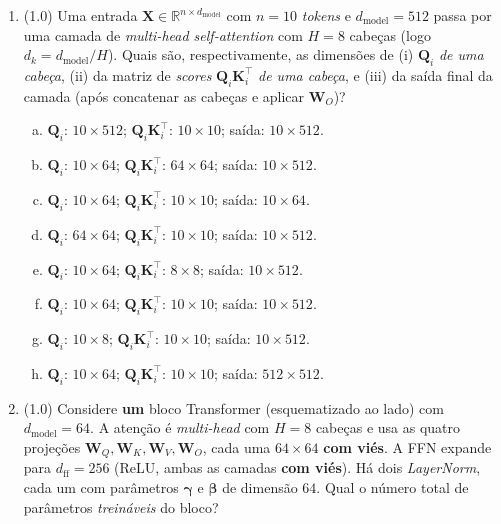 \documentclass[11pt,a4paper]{article}
\begin{document}
\begin{enumerate}[1)]


\item (1.0) Uma entrada $\mathbf{X} \in \mathbb{R}^{n \times d_{\text{model}}}$ com $n = 10$ \textit{tokens} e $d_{\text{model}} = 512$ passa por uma camada de \textit{multi-head self-attention} com $H = 8$ cabeças (logo $d_k = d_{\text{model}}/H$). Quais são, respectivamente, as dimensões de (i) $\mathbf{Q}_i$ \emph{de uma cabeça}, (ii) da matriz de \textit{scores} $\mathbf{Q}_i \mathbf{K}_i^\top$ \emph{de uma cabeça}, e (iii) da saída final da camada (após concatenar as cabeças e aplicar $\mathbf{W}_O$)?

\begin{enumerate}[a)]
    \item $\mathbf{Q}_i$: $10 \times 512$; \quad $\mathbf{Q}_i \mathbf{K}_i^\top$: $10 \times 10$; \quad saída: $10 \times 512$.
    \item $\mathbf{Q}_i$: $10 \times 64$; \quad $\mathbf{Q}_i \mathbf{K}_i^\top$: $64 \times 64$; \quad saída: $10 \times 512$.
    \item $\mathbf{Q}_i$: $10 \times 64$; \quad $\mathbf{Q}_i \mathbf{K}_i^\top$: $10 \times 10$; \quad saída: $10 \times 64$.
    \item $\mathbf{Q}_i$: $64 \times 64$; \quad $\mathbf{Q}_i \mathbf{K}_i^\top$: $10 \times 10$; \quad saída: $10 \times 512$.
    \item $\mathbf{Q}_i$: $10 \times 64$; \quad $\mathbf{Q}_i \mathbf{K}_i^\top$: $8 \times 8$; \quad saída: $10 \times 512$.
    \item $\mathbf{Q}_i$: $10 \times 64$; \quad $\mathbf{Q}_i \mathbf{K}_i^\top$: $10 \times 10$; \quad saída: $10 \times 512$.
    \item $\mathbf{Q}_i$: $10 \times 8$; \quad $\mathbf{Q}_i \mathbf{K}_i^\top$: $10 \times 10$; \quad saída: $10 \times 512$.
    \item $\mathbf{Q}_i$: $10 \times 64$; \quad $\mathbf{Q}_i \mathbf{K}_i^\top$: $10 \times 10$; \quad saída: $512 \times 512$.
\end{enumerate}

\pagebreak

\item (1.0) Considere \textbf{um} bloco Transformer (esquematizado ao lado) com $d_{\text{model}} = 64$. A atenção é \textit{multi-head} com $H = 8$ cabeças e usa as quatro projeções $\mathbf{W}_Q, \mathbf{W}_K, \mathbf{W}_V, \mathbf{W}_O$, cada uma $64 \times 64$ \textbf{com viés}. A FFN expande para $d_{\text{ff}} = 256$ (ReLU, ambas as camadas \textbf{com viés}). Há dois \textit{LayerNorm}, cada um com parâmetros $\boldsymbol{\gamma}$ e $\boldsymbol{\beta}$ de dimensão $64$. Qual o número total de parâmetros \emph{treináveis} do bloco?


\end{enumerate}
\end{document}
